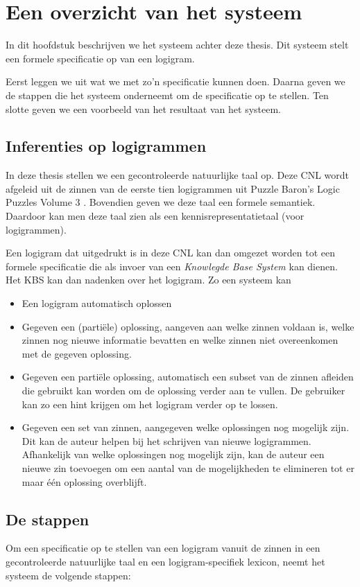 \chapter{Een overzicht van het systeem}

In dit hoofdstuk beschrijven we het systeem achter deze thesis. Dit systeem stelt een formele specificatie op van een logigram.

Eerst leggen we uit wat we met zo'n specificatie kunnen doen. Daarna geven we de stappen die het systeem onderneemt om de specificatie op te stellen. Ten slotte geven we een voorbeeld van het resultaat van het systeem.

\section{Inferenties op logigrammen}
In deze thesis stellen we een gecontroleerde natuurlijke taal op. Deze CNL wordt afgeleid uit de zinnen van de eerste tien logigrammen uit Puzzle Baron's Logic Puzzles Volume 3 \cite{logigrammen}. Bovendien geven we deze taal een formele semantiek. Daardoor kan men deze taal zien als een kennisrepresentatietaal (voor logigrammen).

Een logigram dat uitgedrukt is in deze CNL kan dan omgezet worden tot een formele specificatie die als invoer van een \textit{Knowlegde Base System} kan dienen. Het KBS kan dan nadenken over het logigram. Zo een systeem kan

\begin{itemize}
  \item Een logigram automatisch oplossen
  \item Gegeven een (partiële) oplossing, aangeven aan welke zinnen voldaan is, welke zinnen nog nieuwe informatie bevatten en welke zinnen niet overeenkomen met de gegeven oplossing.
  \item Gegeven een partiële oplossing, automatisch een subset van de zinnen afleiden die gebruikt kan worden om de oplossing verder aan te vullen. De gebruiker kan zo een hint krijgen om het logigram verder op te lossen.
  \item Gegeven een set van zinnen, aangegeven welke oplossingen nog mogelijk zijn. Dit kan de auteur helpen bij het schrijven van nieuwe logigrammen. Afhankelijk van welke oplossingen nog mogelijk zijn, kan de auteur een nieuwe zin toevoegen om een aantal van de mogelijkheden te elimineren tot er maar één oplossing overblijft.
\end{itemize}

\section{De stappen}
Om een specificatie op te stellen van een logigram vanuit de zinnen in een gecontroleerde natuurlijke taal en een logigram-specifiek lexicon, neemt het systeem de volgende stappen:

